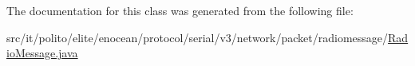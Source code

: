 The documentation for this class was generated from the following file\+:\begin{DoxyCompactItemize}
\item 
src/it/polito/elite/enocean/protocol/serial/v3/network/packet/radiomessage/\hyperlink{it_2polito_2elite_2enocean_2protocol_2serial_2v3_2network_2packet_2radiomessage_2_radio_message_8java}{Radio\+Message.\+java}\end{DoxyCompactItemize}
